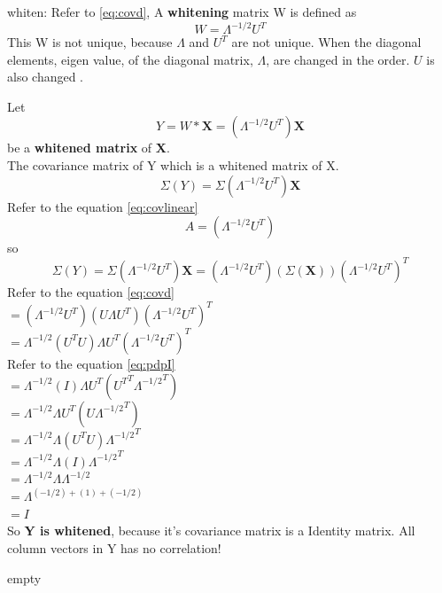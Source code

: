 \documentclass[a4paper,12pt]{article}
\begin{document}
\begin{compactitem}
\item whiten: Refer to \eqref{eq:covd},  A \textbf{whitening} matrix W is defined as
\begin{equation}
\label{eq:whitem}
W=\Lambda^{-1/2} U^{T}
\end{equation}
This W is not unique, because $\Lambda$ and $U^T$ are not unique.
When the diagonal elements, eigen value, of the diagonal matrix, $\Lambda$, are changed in the order.
$U$ is also changed .

Let
\begin{equation}
\label{eq:whitened}
Y = W*\textbf{X}= (\Lambda^{-1/2} U^{T}) \textbf{X}
\end{equation}
be a \textbf{whitened matrix} of \textbf{X}.\\
The covariance matrix of Y which is a whitened matrix of X.
\[
\Sigma (Y)=\Sigma (\Lambda^{-1/2} U^{T}) \textbf{X}
\]
Refer to the equation \eqref{eq:covlinear}
\[
A=(\Lambda^{-1/2} U^{T})
\]
so
\[
\Sigma (Y)=\Sigma (\Lambda^{-1/2} U^{T}) \textbf{X}=
(\Lambda^{-1/2} U^{T})(\Sigma (\textbf{X})) (\Lambda^{-1/2} U^{T})^{T}
\]
Refer to the equation \eqref{eq:covd}\\
$=(\Lambda^{-1/2} U^{T}) (U \Lambda U^{T}) (\Lambda^{-1/2} U^{T}) ^T$\\
$=\Lambda^{-1/2} (U^{T}  U) \Lambda U^{T} (\Lambda^{-1/2} U^{T}) ^T$\\
Refer to the equation \eqref{eq:pdpI}\\
$=\Lambda^{-1/2} (I) \Lambda U^{T} ({U^{T}}^T{\Lambda^{-1/2}}^T)$\\
$=\Lambda^{-1/2} \Lambda U^{T} (U{\Lambda^{-1/2}}^T)$\\
$=\Lambda^{-1/2} \Lambda (U^{T} U) {\Lambda^{-1/2}}^T$\\
$=\Lambda^{-1/2} \Lambda (I) {\Lambda^{-1/2}}^T$\\
$=\Lambda^{-1/2} \Lambda \Lambda^{-1/2}$\\
$=\Lambda^{(-1/2) + (1) + (-1/2)}$\\
$=I$\\
So \textbf{Y is whitened}, because it's covariance matrix is a Identity matrix.
All column vectors in Y has no correlation!

\end{compactitem}

\begin{compactitem}
\item empty
\end{compactitem}

\end{document}
